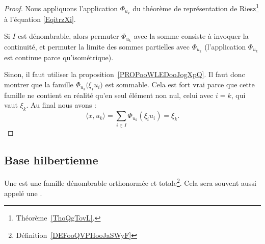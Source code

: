 \begin{proof}
	Nous appliquons l'application \( \Phi_{u_k}\) du théorème de représentation de Riesz\footnote{Théorème~\ref{ThoQgTovL}.} à l'équation \eqref{EqitrzXi}.

	Si \( I\) est dénombrable, alors permuter \( \Phi_{u_k}\) avec la somme consiste à invoquer la continuité, et permuter la limite des sommes partielles avec \( \Phi_{u_k}\) (l'application \( \Phi_{u_k}\) est continue parce qu'isométrique).

	Sinon, il faut utiliser la proposition~\ref{PROPooWLEDooJogXpQ}. Il faut donc montrer que la famille \( \Phi_{u_k}\big( \xi_iu_i \big)\) est sommable. Cela est fort vrai parce que cette famille ne contient en réalité qu'en seul élément non nul, celui avec \( i=k\), qui vaut \( \xi_k\). Au final nous avons :
	\begin{equation}
		\langle x, u_k\rangle =\sum_{i\in I}\Phi_{u_k}(\xi_iu_i)=\xi_k.
	\end{equation}
\end{proof}

\subsection{Base hilbertienne}

\begin{definition}      \label{DEFooADQXooFoIhTG}
	Une  est une famille dénombrable orthonormée et totale\footnote{Définition~\ref{DEFooQVPHooJaSWyF}}. Cela sera souvent aussi appelé une .
\end{definition}

